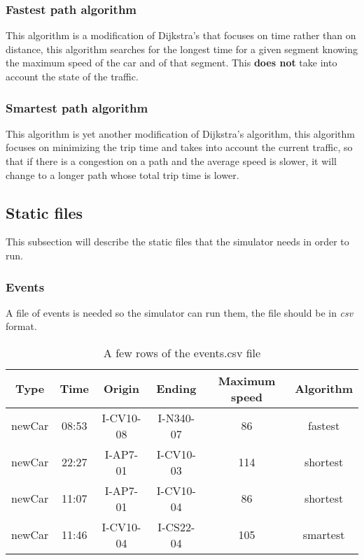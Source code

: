 \subsubsection{Fastest path algorithm}

This algorithm is a modification of Dijkstra's that focuses on time rather than on distance, this algorithm searches for the longest time for a given segment knowing the maximum speed of the car and of that segment. This \textbf{does not} take into account the state of the traffic.

\subsubsection{Smartest path algorithm}

This algorithm is yet another modification of Dijkstra's algorithm, this algorithm focuses on minimizing the trip time and takes into account the current traffic, so that if there is a congestion on a path and the average speed is slower, it will change to a longer path whose total trip time is lower.

\subsection{Static files}

This subsection will describe the static files that the simulator needs in order to run.

\subsubsection{Events}

A file of events is needed so the simulator can run them, the file should be in \textit{csv} format.

\begin{table}[H]
\centering
\begin{tabular}{|c|c|c|c|c|c|}
\hline 
\textbf{Type} & \textbf{Time} & \textbf{Origin} & \textbf{Ending} & \textbf{Maximum speed} & \textbf{Algorithm} \\ 
\hline 
newCar & 08:53 & I-CV10-08 & I-N340-07 & 86 & fastest \\ 
\hline 
newCar & 22:27 & I-AP7-01 & I-CV10-03 & 114 & shortest \\ 
\hline 
newCar & 11:07 & I-AP7-01 & I-CV10-04 & 86 & shortest \\ 
\hline 
newCar & 11:46 & I-CV10-04 & I-CS22-04 & 105 & smartest \\ 
\hline 
\end{tabular}
\caption{A few rows of the events.csv file}
\end{table}

